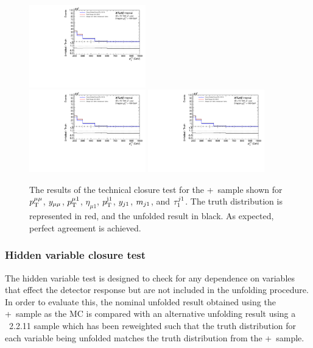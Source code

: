 \begin{figure}[h!]
  \includegraphics[page=584,width=0.45\textwidth]{figures/IBUClosureTests.pdf} \\
  \includegraphics[page=596,width=0.45\textwidth]{figures/IBUClosureTests.pdf}
  \includegraphics[page=602,width=0.45\textwidth]{figures/IBUClosureTests.pdf}
  \caption{The results of the technical closure test for the \powheg+\pythia~sample shown for $p_\mathrm{T}^{\mu\mu}$, $y_{\mu\mu}$, $p_\mathrm{T}^{\mu 1}$, $\eta_{\mu1}$, $p_\mathrm{T}^{\mathrm{j1}}$, $y_{j1}$, $m_{j1}$, and $\tau^{j1}_{1}$. The truth distribution is represented in red, and the unfolded result in black. As expected, perfect agreement is achieved.}
  \label{fig:TechClo}
\end{figure}

\subsubsection{Hidden variable closure test}
The hidden variable test is designed to check for any dependence on variables that effect the detector response but are not included in the unfolding procedure.
In order to evaluate this, the nominal unfolded result obtained using the \powheg+\pythia~sample as the MC is compared with an alternative unfolding result using a \sherpa~2.2.11 sample which has been reweighted such that the truth distribution for each variable being unfolded matches the truth distribution from the \powheg+\pythia~sample.

